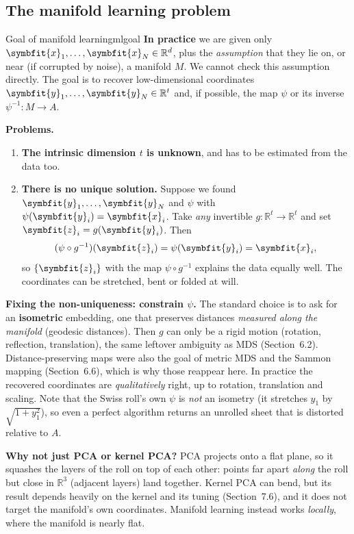 \documentclass[11pt]{article}
\newcommand{\bm}[1]{\symbfit{#1}}
\newcommand{\R}{\mathbb{R}}
\newcommand{\vx}{\bm{x}}
\begin{document}
\subsection{The manifold learning problem}

\begin{definition}{Goal of manifold learning}{mlgoal}
\textbf{In practice} we are given only $\vx_1,\dots,\vx_N\in\R^d$, plus the \emph{assumption} that they lie on, or near (if corrupted
by noise), a manifold $M$. We cannot check this assumption directly. The goal is to recover low-dimensional coordinates
$\bm y_1,\dots,\bm y_N\in\R^t$ and, if possible, the map $\psi$ or its inverse $\psi^{-1}:M\to A$.
\end{definition}

\textbf{Problems.}
\begin{enumerate}[label=\arabic*)]
\item \textbf{The intrinsic dimension $t$ is unknown}, and has to be estimated from the data too.
\item \textbf{There is no unique solution.} Suppose we found $\bm y_1,\dots,\bm y_N$ and $\psi$ with $\psi(\bm y_i)=\vx_i$. Take \emph{any} invertible
$g:\R^t\to\R^t$ and set $\bm z_i=g(\bm y_i)$. Then
\[
(\psi\circ g^{-1})(\bm z_i)=\psi(\bm y_i)=\vx_i ,
\]
so $\{\bm z_i\}$ with the map $\psi\circ g^{-1}$ explains the data equally well. The coordinates can be stretched, bent or folded at will.
\end{enumerate}

\begin{intuition}
\textbf{Fixing the non-uniqueness: constrain $\psi$.} The standard choice is to ask for an \textbf{isometric} embedding, one that
preserves distances \emph{measured along the manifold} (geodesic distances). Then $g$ can only be a rigid motion (rotation,
reflection, translation), the same leftover ambiguity as MDS (Section~6.2). Distance-preserving maps were also the
goal of metric MDS and the Sammon mapping (Section~6.6), which is why those reappear here. In practice the recovered
coordinates are \emph{qualitatively} right, up to rotation, translation and scaling. Note that the Swiss roll's own $\psi$ is
\emph{not} an isometry (it stretches $y_1$ by $\sqrt{1+y_1^2}$), so even a perfect algorithm returns an unrolled sheet that is
distorted relative to $A$.
\end{intuition}

\begin{careful}
\textbf{Why not just PCA or kernel PCA?} PCA projects onto a flat plane, so it squashes the layers of the roll on
top of each other: points far apart \emph{along} the roll but close in $\R^3$ (adjacent layers) land together. Kernel PCA can
bend, but its result depends heavily on the kernel and its tuning (Section~7.6), and it does not target the
manifold's own coordinates. Manifold learning instead works \emph{locally}, where the manifold is nearly flat.
\end{careful}
\end{document}
